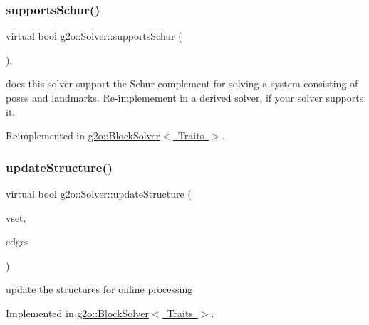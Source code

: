 \subsubsection{\texorpdfstring{supports\+Schur()}{supportsSchur()}}
{\footnotesize\ttfamily virtual bool g2o\+::\+Solver\+::supports\+Schur (\begin{DoxyParamCaption}{ }\end{DoxyParamCaption})\hspace{0.3cm}{\ttfamily [inline]}, {\ttfamily [virtual]}}

does this solver support the Schur complement for solving a system consisting of poses and landmarks. Re-\/implemement in a derived solver, if your solver supports it. 

Reimplemented in \mbox{\hyperlink{classg2o_1_1_block_solver_a68dc822ce48e80ceacce69c7bd029674}{g2o\+::\+Block\+Solver$<$ Traits $>$}}.

\mbox{\label{classg2o_1_1_solver_aeca71878e37081b6138f90ac60ec1f89}} 
\subsubsection{\texorpdfstring{update\+Structure()}{updateStructure()}}
{\footnotesize\ttfamily virtual bool g2o\+::\+Solver\+::update\+Structure (\begin{DoxyParamCaption}\item[{const std\+::vector$<$ \mbox{\hyperlink{classg2o_1_1_hyper_graph_1_1_vertex}{Hyper\+Graph\+::\+Vertex}} $\ast$$>$ \&}]{vset,  }\item[{const \mbox{\hyperlink{classg2o_1_1_hyper_graph_a5e2970e236c0dcb4eff7c205d7b6b4ae}{Hyper\+Graph\+::\+Edge\+Set}} \&}]{edges }\end{DoxyParamCaption})\hspace{0.3cm}{\ttfamily [pure virtual]}}

update the structures for online processing 

Implemented in \mbox{\hyperlink{classg2o_1_1_block_solver_a662473598270cdf89075607f87440759}{g2o\+::\+Block\+Solver$<$ Traits $>$}}.

\mbox{\label{classg2o_1_1_solver_a7a5907ca706eef77acce4ab534857c96}} 
